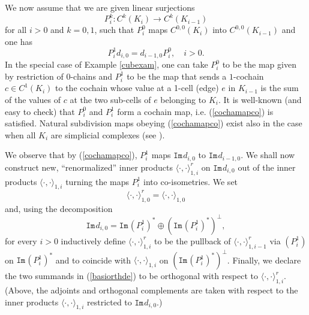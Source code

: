 \documentclass[11pt,reqno]{amsart}
\numberwithin{equation}{section}
\theoremstyle{remark}
\theoremstyle{rmdefinition}
\begin{document}
We now assume that we are given linear surjections $$P^k_{i}: C^{k}(K_i) \rightarrow C^{k}(K_{i-1})$$ for all $i>0$ and $k=0,1$, such that 
$P^0_{i}$ maps $C^{0,0}(K_i)$ into $C^{0,0}(K_{i-1})$ and one has 
\begin{equation}\label{cochamapco}
	P^1_{i}d_{i,0} =d_{i-1,0} P^0_{i}, \quad i>0.
\end{equation}
In the special case of Example \ref{cubexam}, one can take $P^0_{i}$ to be  the map given by restriction of 0-chains and $P^1_{i}$ to be the map that sends a $1$-cochain $c \in C^{1}(K_i)$ to the cochain whose value at a 1-cell (edge) $e$ in $K_{i-1}$ is the sum of the values of $c$ at the two sub-cells of $e$ belonging to $K_{i}$. It is well-known (and easy to check) that $P^0_{i}$ and $P^1_{i}$ form a cochain map, i.e. (\ref{cochamapco}) is satisfied. Natural subdivision maps obeying (\ref{cochamapco}) exist also in the case when all $K_i$ are simplicial complexes (see \cite[Chapter 2, \S 17]{Mu}).

We observe that by (\ref{cochamapco}),  $P^1_{i}$ maps $\mathtt{Im}\hspace{1pt}d_{i,0}$ to  $\mathtt{Im}\hspace{1pt}d_{i-1,0}$.
We shall now construct new, ``renormalized'' inner products $\langle \cdot, \cdot \rangle_{1,i}^r$ on $\mathtt{Im}\hspace{1pt}d_{i,0}$ out of the inner products $\langle \cdot, \cdot \rangle_{1,i}$  turning the maps $P^1_{i}$ into co-isometries. We set 
$$ \langle \cdot, \cdot \rangle_{1,0}^r=\langle \cdot, \cdot \rangle_{1,0}$$
and, using the decomposition
\begin{equation}\label{basiorthde}
\mathtt{Im}\hspace{1pt}d_{i,0}=\mathtt{Im}\hspace{1pt}(P^1_{i})^* \oplus (\mathtt{Im}\hspace{1pt}(P^1_{i})^*)^{\perp},
\end{equation} 
for every $i>0$ inductively define $\langle \cdot, \cdot \rangle_{1,i}^r$   to be the pullback of $\langle \cdot, \cdot \rangle_{1,i-1}^r$ via $(P^1_{i})$ on $\mathtt{Im}\hspace{1pt}(P^1_{i})^*$ and to coincide with $\langle \cdot, \cdot \rangle_{1,i}$ on $(\mathtt{Im}\hspace{1pt}(P^1_{i})^*)^{\perp}$.
Finally, we declare the two summands in (\ref{basiorthde}) to be orthogonal with respect to  $\langle \cdot, \cdot \rangle_{1,i}^r$. (Above, the adjoints and orthogonal complements are taken with respect to the inner products $\langle \cdot, \cdot \rangle_{1,i}$ restricted to $\mathtt{Im}\hspace{1pt}d_{i,0}$.)
\end{document}
